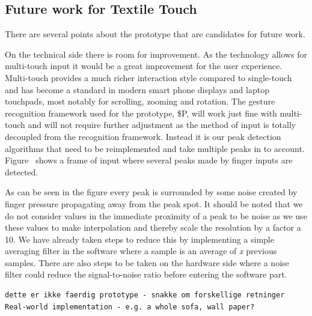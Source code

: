 \subsection{Future work for Textile Touch}
\label{ch:textiletouch:futurework}

There are several points about the prototype that are candidates for future work.

On the technical side there is room for improvement.
As the technology allows for multi-touch input it would be a great improvement for the user experience.
Multi-touch provides a much richer interaction style  compared to single-touch and has become a standard in modern smart phone displays and laptop touchpads, most notably for scrolling, zooming and rotation.
The gesture recognition framework used for the prototype, \$P, will work just fine with multi-touch and will not require further adjustment as the method of input is totally decoupled from the recognition framework. 
Instead it is our peak detection algorithms that need to be reimplemented and take multiple peaks in to account.
Figure~ shows a frame of input where several peaks made by finger inputs are detected. 

As can be seen in the figure every peak is surrounded by some noise created by finger pressure propagating away from the peak spot.
It should be noted that we do not consider values in the immediate proximity of a peak to be noise as we use these values to make interpolation and thereby scale the resolution by a factor a 10.
We have already taken steps to reduce this by implementing a simple averaging filter in the software 
where a sample is an average of \emph{x} previous samples.
There are also steps to be taken on the hardware side where a noise filter could reduce the signal-to-noise ratio before entering the software part.


\begin{verbatim}
dette er ikke faerdig prototype - snakke om forskellige retninger
Real-world implementation - e.g. a whole sofa, wall paper?
\end{verbatim}

